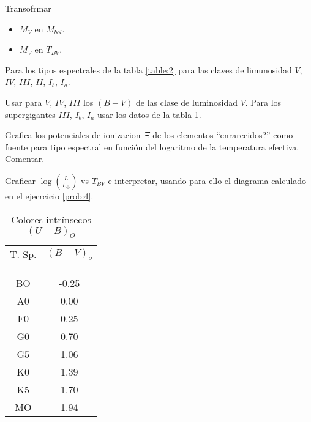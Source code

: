 \documentclass[12pt,a4paper]{practice}
\begin{document}
    \begin{problem}\label{prob:13}
        Transofrmar
            \begin{itemize}
                \item $M_{V}$ en $M_{bol}$.
                \item $M_{V}$ en $T_{BV}$.
            \end{itemize}

            Para los tipos espectrales de la tabla \ref{table:2} para las claves de limunosidad $V$, $IV$, $III$, $II$, $I_{b}$, $I_{a}$.

            Usar para $V$, $IV$, $III$ los $\left(B-V\right)$ de las clase de luminosidad $V$. Para los supergigantes $III$, $I_{b}$, $I_{a}$ usar los datos de la tabla \ref{table:3}.
    \end{problem}

    \begin{problem}\label{prob:14}
        Grafica los potenciales de ionizacion $\Xi$ de los elementos ``enrarecidos?'' como fuente para tipo espectral en función del logaritmo de la temperatura efectiva. Comentar.
    \end{problem}

    \begin{problem}\label{prob:15}
        \begin{problempart}\label{prob:15:B}
            Graficar $\log\left(\frac{L}{L_\odot}\right)$ vs $T_{BV}$ e interpretar, usando para ello el diagrama calculado en el ejecrcicio \ref{prob:4}.
        \end{problempart}

        \begin{table}[h!]
            \centering
            \begin{tabular}{c | c}
                T. Sp.  & $\left(B-V\right)_{o}$ \\\\
                  &  \\[-0.8em]\hline
                  &  \\[-0.8em]
                BO & -0.25 \\
                A0 &  0.00 \\
                F0 &  0.25 \\
                G0 &  0.70 \\
                G5 &  1.06 \\
                K0 &  1.39 \\
                K5 &  1.70 \\
                MO &  1.94 \\
                \hline
            \end{tabular}
            \caption{
                Colores intrínsecos $\left(U-B\right)_O$
            }\label{table:3}
        \end{table}
    \end{problem}
\end{document}
